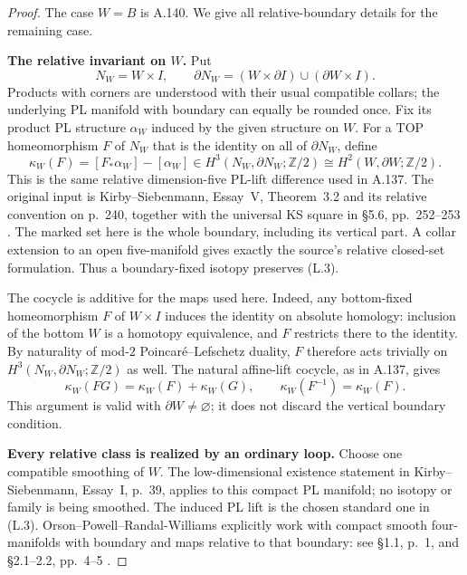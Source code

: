 \begin{proof}
The case $W=B$ is A.140. We give all relative-boundary details
for the remaining case.

\textbf{The relative invariant on $W$.}
Put
\[
 N_W=W\times I,
 \qquad
 \partial N_W=(W\times\partial I)\cup(\partial W\times I).
\]
Products with corners are understood with their usual compatible
collars; the underlying PL manifold with boundary can equally be
rounded once. Fix its product PL structure $\alpha_W$ induced
by the given structure on $W$. For a TOP homeomorphism $F$ of
$N_W$ that is the identity on all of $\partial N_W$, define
\[
 \kappa_W(F)=[F_*\alpha_W]-[\alpha_W]
       \in H^3(N_W,\partial N_W;\mathbb Z/2)
       \cong H^2(W,\partial W;\mathbb Z/2).           \tag{L.3}
\]
This is the same relative dimension-five PL-lift difference
used in A.137. The original input is Kirby--Siebenmann,
Essay~V, Theorem~3.2 and its relative convention on p.~240,
together with the universal KS square in \S5.6,
pp.~252--253 \cite{KirbySiebenmann1977}. The marked set here
is the whole boundary, including its vertical part. A collar
extension to an open five-manifold gives exactly the source's
relative closed-set formulation. Thus a boundary-fixed isotopy
preserves (L.3).

The cocycle is additive for the maps used here. Indeed, any
bottom-fixed homeomorphism $F$ of $W\times I$ induces the
identity on absolute homology: inclusion of the bottom $W$
is a homotopy equivalence, and $F$ restricts there to the
identity. By naturality of mod-$2$ Poincar\'e--Lefschetz
duality, $F$ therefore acts trivially on
$H^3(N_W,\partial N_W;\mathbb Z/2)$ as well.
The natural affine-lift cocycle, as in A.137, gives
\[
 \kappa_W(FG)=\kappa_W(F)+\kappa_W(G),
 \qquad \kappa_W(F^{-1})=\kappa_W(F).                 \tag{L.4}
\]
This argument is valid with $\partial W\ne\varnothing$;
it does not discard the vertical boundary condition.

\textbf{Every relative class is realized by an ordinary loop.}
Choose one compatible smoothing of $W$. The low-dimensional
existence statement in Kirby--Siebenmann, Essay~I, p.~39,
applies to this compact PL manifold; no isotopy or family is
being smoothed. The induced PL lift is the chosen standard
one in (L.3).
Orson--Powell--Randal-Williams explicitly work with compact
smooth four-manifolds with boundary and maps relative to that
boundary: see \S1.1, p.~1, and \S2.1--2.2, pp.~4--5
\cite{OrsonPowellRandalWilliams2026}.


\end{proof}

